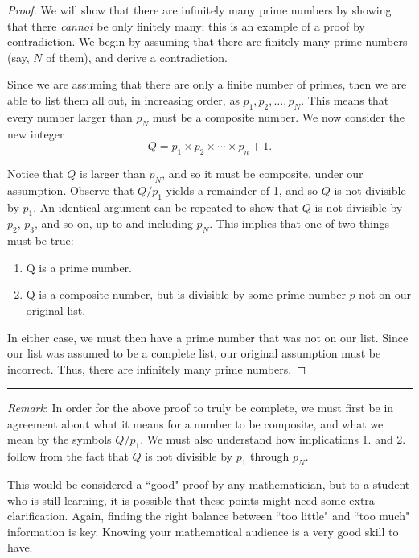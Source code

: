 \documentclass[12pt]{article}
\newtheorem{theorem}{\color{navy}Theorem}[section]
\theoremstyle{definition}
\numberwithin{equation}{subsection}
\begin{document}
\begin{proof}
We will show that there are infinitely many prime numbers by showing that there \emph{cannot} be only finitely many; this is an example of a proof by contradiction. We begin by assuming that there are finitely many prime numbers (say, $N$ of them), and derive a contradiction.

Since we are assuming that there are only a finite number of primes, then we are able to list them all out, in increasing order, as $p_1, p_2, \dots, p_N$. This means that every number larger than $p_N$ must be a composite number. We now consider the new integer
$$Q = p_1\times p_2\times\cdots \times p_n + 1.$$

Notice that $Q$ is larger than $p_N$, and so it must be composite, under our assumption. Observe that $Q / p_1$ yields a remainder of 1, and so $Q$ is not divisible by $p_1$. An identical argument can be repeated to show that $Q$ is not divisible by $p_2$, $p_3$, and so on, up to and including $p_N$. This implies that one of two things must be true:
\begin{enumerate}
\item Q is a prime number.
\item Q is a composite number, but is divisible by some prime number $p$ not on our original list.
\end{enumerate}

In either case, we must then have a prime number that was not on our list. Since our list was assumed to be a complete list, our original assumption must be incorrect. Thus, there are infinitely many prime numbers.
\end{proof}

\hrule

\bigskip

\emph{Remark}: In order for the above proof to truly be complete, we must first be in agreement about what it means for a number to be composite, and what we mean by the symbols $Q/p_1$. We must also understand how implications 1. and 2. follow from the fact that $Q$ is not divisible by $p_1$ through $p_N$.

This would be considered a ``good" proof by any mathematician, but to a student who is still learning, it is possible that these points might need some extra clarification. Again, finding the right balance between ``too little" and ``too much" information is key. Knowing your mathematical audience is a very good skill to have.


\end{document}
